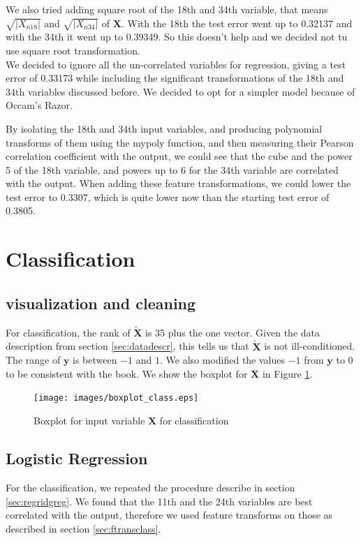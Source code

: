 \documentclass{article} %
\begin{document}
We also tried adding square root of the 18th and 34th variable, that means $\sqrt{|X_{n18}|}$ and $\sqrt{|X_{n34}|}$ of $\mathbf{X}$. With the 18th the test error went up to 0.32137 and with the 34th it went up to 0.39349. So this doesn't help and we decided not tu use square root transformation.\\

We decided to ignore all the un-correlated variables for regression, giving a test error of 0.33173 while including the significant transformations of the 18th and 34th variables discussed before. We decided to opt for a simpler model because of Occam’s Razor.

By isolating the 18th and 34th input variables, and producing polynomial transforms of them using the mypoly function, and then measuring their Pearson correlation coefficient with the output, we could see that the cube and the power 5 of the 18th variable, and powers up to 6 for the 34th variable are correlated with the output. When adding these feature transformations, we could lower the test error to 0.3307, which is quite lower now than the starting test error of 0.3805.
\section{Classification}
\subsection{visualization and cleaning}

For classification, the rank of $\mathbf{\tilde{X}}$ is 35 plus the one vector. Given the data description from section \ref{sec:datadescr}, this tells us that $\mathbf{\tilde{X}}$ is not ill-conditioned.\\ The range of $\mathbf{y}$ is between $-1$ and $1$. We also modified the values $-1$ from $\mathbf{y}$ to 0 to be consistent with the book. We show the boxplot for $\mathbf{X}$ in Figure \ref{fig:boxplotclass}.
\begin{figure}
\centering
\texttt{[image: images/boxplot\_class.eps]}
\caption{Boxplot for input variable $\mathbf{X}$ for classification}
\label{fig:boxplotclass}
\end{figure}
\subsection{Logistic Regression}
For the classification, we repeated the procedure describe in section \ref{sec:regridgreg}. We found that the 11th and the 24th variables are best correlated with the output, therefore we used feature transforms on those as described in section \ref{sec:ftransclass}.
\end{document}
